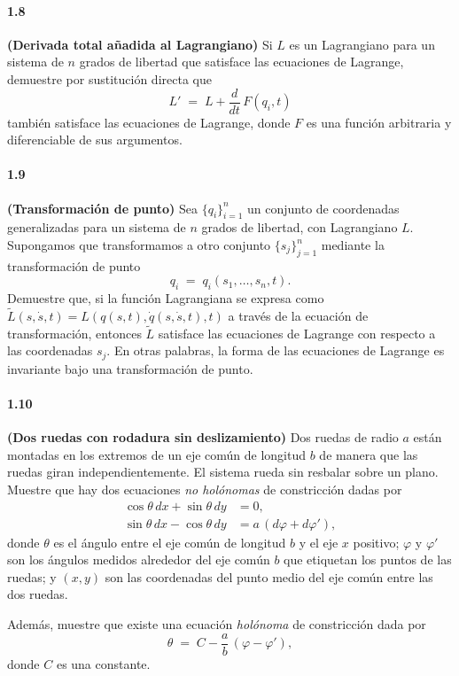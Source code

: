 \documentclass[12pt]{article}
\begin{document}
\paragraph{1.8}\textbf{(Derivada total añadida al Lagrangiano)}\;
Si $L$ es un Lagrangiano para un sistema de $n$ grados de libertad que satisface las ecuaciones de Lagrange, demuestre por sustitución directa que
\begin{equation}
L' \;=\; L + \frac{d}{dt}\,F(q_i,t)
\end{equation}
también satisface las ecuaciones de Lagrange, donde $F$ es una función arbitraria y diferenciable de sus argumentos.

\paragraph{1.9}\textbf{(Transformación de punto)}\;
Sea $\{q_i\}_{i=1}^n$ un conjunto de coordenadas generalizadas para un sistema de $n$ grados de libertad, con Lagrangiano $L$.
Supongamos que transformamos a otro conjunto $\{s_j\}_{j=1}^n$ mediante la transformación de punto
\begin{equation}
q_i \;=\; q_i(s_1,\ldots,s_n,t).
\end{equation}
Demuestre que, si la función Lagrangiana se expresa como $\tilde L(s,\dot s,t)=L(q(s,t),\dot q(s,\dot s,t),t)$ a través de la ecuación de transformación, entonces $\tilde L$ satisface las ecuaciones de Lagrange con respecto a las coordenadas $s_j$.
En otras palabras, la forma de las ecuaciones de Lagrange es invariante bajo una transformación de punto.

\paragraph{1.10}\textbf{(Dos ruedas con rodadura sin deslizamiento)}\;
Dos ruedas de radio $a$ están montadas en los extremos de un eje común de longitud $b$ de manera que las ruedas giran independientemente. El sistema rueda sin resbalar sobre un plano. 
Muestre que hay dos ecuaciones \emph{no holónomas} de constricción dadas por
\begin{align}
\cos\theta\,dx + \sin\theta\,dy &= 0, \\
\sin\theta\,dx - \cos\theta\,dy &= a\,(d\varphi + d\varphi'),
\end{align}
donde $\theta$ es el ángulo entre el eje común de longitud $b$ y el eje $x$ positivo; $\varphi$ y $\varphi'$ son los ángulos medidos alrededor del eje común $b$ que etiquetan los puntos de las ruedas; y $(x,y)$ son las coordenadas del punto medio del eje común entre las dos ruedas.
\par\noindent
Además, muestre que existe una ecuación \emph{holónoma} de constricción dada por
\begin{equation}
\theta \;=\; C - \frac{a}{b}\,(\varphi - \varphi'),
\end{equation}
donde $C$ es una constante.
\end{document}
